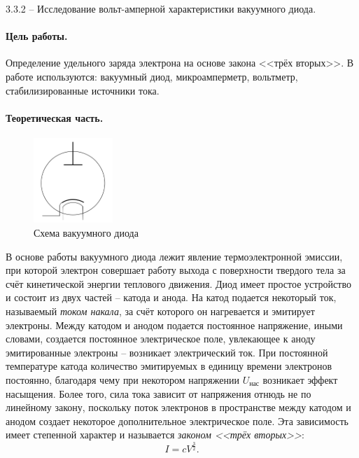\documentclass{../lab_class}
\begin{document}
{\Large 3.3.2 -- Исследование вольт-амперной характеристики вакуумного диода.}

\paragraph{Цель работы.}
Определение удельного заряда электрона на основе закона <<трёх вторых>>.
В работе используются: вакуумный диод, микроамперметр, вольтметр, стабилизированные источники тока.

\paragraph{Теоретическая часть.}

\begin{figure}
\centering
\includegraphics[width=3cm]{vacuum_diode.png}
\caption{Схема вакуумного диода}
\end{figure}

В основе работы вакуумного диода лежит явление термоэлектронной эмиссии, при которой электрон совершает работу выхода с поверхности твердого тела за счёт кинетической энергии теплового движения. Диод имеет простое устройство и состоит из двух частей -- катода и анода. На катод подается некоторый ток, называемый \emph{током накала}, за счёт которого он нагревается и эмитирует электроны. Между катодом и анодом подается постоянное напряжение, иными словами, создается постоянное электрическое поле, увлекающее к аноду эмитированные электроны -- возникает электрический ток. При постоянной температуре катода количество эмитируемых в единицу времени электронов постоянно, благодаря чему при некотором напряжении $U_{\text{нас}}$ возникает эффект насыщения. Более того, сила тока зависит от напряжения отнюдь не по линейному закону, поскольку поток электронов в пространстве между катодом и анодом создает некоторое дополнительное электрическое поле. Эта зависимость имеет степенной характер и называется \emph{законом <<трёх вторых>>}:
\begin{equation}
	I = c V^{\frac{3}{2}}.
\end{equation}
\end{document}
